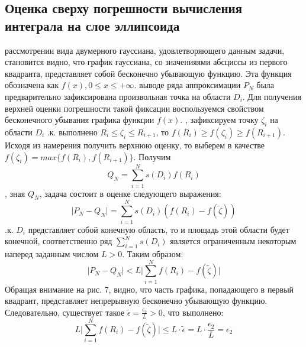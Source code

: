 \subsection{Оценка сверху погрешности вычисления интеграла на слое эллипсоида}
 рассмотрении вида двумерного гауссиана, удовлетворяющего данным задачи, становится видно, что график гауссиана, со значенияями абсциссы из первого квадранта, представляет собой бесконечно убывающую функцию. Эта функция обозначена как $f(x), 0 \le x \le +\infty$.
 выводе ряда аппроксимации $P_N$ была предварительно зафиксирована произвольная точка на области $D_i$. Для получения верхней оценки погрешности такой фиксации воспользуемся свойством бесконечного убывания графика функции $f(x)$.
, зафиксируем точку $\zeta_i$ на области $D_i$ 
.к. выполнено $R_i \le \zeta_i \le R_{i+1}$, то $f(R_i)\ge f(\zeta_i)\ge f(R_{i+1})$. Исходя из намерения получить верхнюю оценку, то выберем в качестве $f(\zeta_i) = max\{f(R_i),f(R_{i+1})\}$. Получим
$$Q_N=\sum_{i=1}^Ns(D_i)f(R_i)$$
, зная $Q_N$, задача состоит в оценке следующего выражения:
$$\vert P_N-Q_N\vert=	\sum_{i=1}^Ns(D_i)(f(R_i) - f(\tilde{\zeta}))$$
.к. $D_i$ представляет собой конечную область, то и площадь этой области будет конечной, соответственно ряд $\sum_{i=1}^N{s(D_i)}$ является ограниченным некоторым наперед заданным числом $L>0$. Таким образом:
$$\vert P_N-Q_N\vert<L\vert\sum_{i=1}^N{f(R_i) - f(\tilde{\zeta})}\vert$$ 
Обращая внимание на рис. 7, видно, что часть графика, попадающего в первый квадрант, представляет непрерывную бесконечно убывающую функцию. Следовательно, существует такое $\tilde{\epsilon}=\frac{\epsilon_2}{L}>0$, что выполнено:
$$L\vert\sum_{i=1}^N{f(R_i) - f(\tilde{\zeta})}\vert\le L\cdot\tilde{\epsilon}=L\cdot\frac{\epsilon_2}{L}=\epsilon_2$$ 
\begin{figure}[h]
\begin{minipage}[h]{0.49\linewidth}
\end{minipage}
\begin{minipage}[h]{0.49\linewidth}
\end{minipage}
\end{figure}